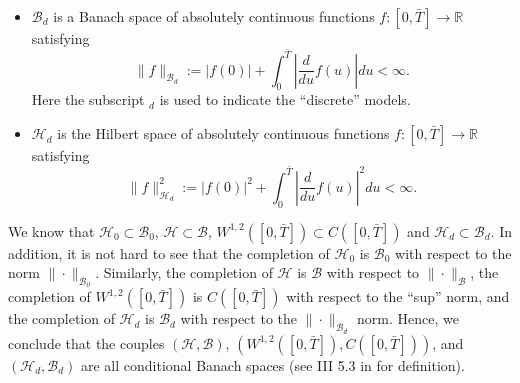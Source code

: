 \documentclass{article}
\numberwithin{equation}{section}
\newcommand\RR {\mathbb R}
\begin{document}
\begin{itemize}
\item $\mathcal{B}_d$ is a Banach space of absolutely continuous functions $f: [0,\bar{T}] \rightarrow \RR$ satisfying
\begin{equation} \label{fo:review:Bdcondition}
\|f\|_{\mathcal{B}_d} := |f(0)| + \int_0^{\bar{T}} | \frac{d}{du} f(u) | du < \infty.
\end{equation}
Here the subscript $_d$ is used to indicate the ``discrete'' models. 

\item $\mathcal{H}_d$ is the Hilbert space of absolutely continuous functions $f: [0,\bar{T}] \rightarrow \RR$ satisfying
\begin{equation} \label{fo:review:Hdcondition}
\|f\|^2_{\mathcal{H}_d} := |f(0)|^2 + \int_0^{\bar{T}} | \frac{d}{du} f(u)|^2 du < \infty.
\end{equation}
\end{itemize}

We know that $\mathcal{H}_0 \subset \mathcal{B}_0$, $\mathcal{H} \subset \mathcal{B}$, $W^{1,2}([0,\bar{T}]) \subset C([0,\bar{T}])$ and $\mathcal{H}_d \subset \mathcal{B}_d$. In addition, it is not hard to see that the completion of $\mathcal{H}_0$ is $\mathcal{B}_0$ with respect to the norm $\| \cdot \|_{\mathcal{B}_0}$. Similarly, the completion of $\mathcal{H}$ is $\mathcal{B}$ with respect to $\| \cdot \|_{\mathcal{B}}$,  the completion of $W^{1,2}([0,\bar{T}])$ is $C([0,\bar{T}])$ with respect to the ``sup'' norm, and the completion of $\mathcal{H}_d$ is $\mathcal{B}_d$ with respect to the $\|\cdot\|_{\mathcal{B}_d}$ norm. Hence, we conclude that the couples $\left(\mathcal{H}, \mathcal{B}\right)$, $\left(W^{1,2}([0,\bar{T}]), C([0,\bar{T}]) \right)$, and $\left(\mathcal{H}_d, \mathcal{B}_d\right)$ are all conditional Banach spaces (see III 5.3 in \cite{Kuo1975GaussianMeasure} for definition). 
\end{document}
